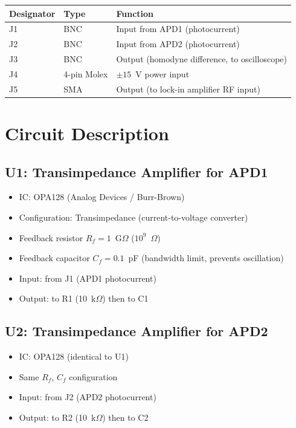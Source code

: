 \documentclass[11pt,a4paper,openany]{book}
\begin{document}
\begin{center}
\begin{tabular}{lll}
\toprule
\textbf{Designator} & \textbf{Type} & \textbf{Function} \\
\midrule
J1 & BNC & Input from APD1 (photocurrent) \\
J2 & BNC & Input from APD2 (photocurrent) \\
J3 & BNC & Output (homodyne difference, to oscilloscope) \\
J4 & 4-pin Molex & $\pm 15$~V power input \\
J5 & SMA & Output (to lock-in amplifier RF input) \\
\bottomrule
\end{tabular}
\end{center}

\section{Circuit Description}

\subsection{U1: Transimpedance Amplifier for APD1}

\begin{itemize}[nosep]
  \item IC: OPA128 (Analog Devices / Burr-Brown)
  \item Configuration: Transimpedance (current-to-voltage converter)
  \item Feedback resistor $R_f = 1$~G$\Omega$ ($10^9$~$\Omega$)
  \item Feedback capacitor $C_f = 0.1$~pF (bandwidth limit, prevents oscillation)
  \item Input: from J1 (APD1 photocurrent)
  \item Output: to R1 (10~k$\Omega$) then to C1
\end{itemize}

\subsection{U2: Transimpedance Amplifier for APD2}

\begin{itemize}[nosep]
  \item IC: OPA128 (identical to U1)
  \item Same $R_f$, $C_f$ configuration
  \item Input: from J2 (APD2 photocurrent)
  \item Output: to R2 (10~k$\Omega$) then to C2
\end{itemize}
\end{document}
